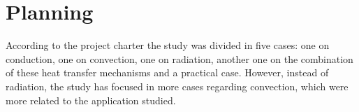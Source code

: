 
\setlength{\parindent}{0pt}

\usepackage{epigraph}
\usepackage{tocloft}
\usepackage{mathcomp}
\usepackage{subcaption}

\usepackage{multicol}
\usepackage[T1]{fontenc}
\usepackage{titlesec, blindtext, color}
\newcommand{\hsp}{\hspace{20pt}}
\titleformat{\chapter}[hang]{\Huge\bfseries}{\thechapter\hsp\textcolor{gray75}{|}\hsp}{0pt}{\Huge\bfseries}


\renewcommand{\familydefault}{\sfdefault}



\newpage\thispagestyle{EmptyPage}


\setcounter{tocdepth}{3}
\tableofcontents
\pagebreak

\newpage
{}

\newpage
\setlength{\parskip}{1em}

\chapter{Planning}
According to the project charter the study was divided in five cases: one on conduction, one on convection,  one on radiation, another one on the combination of these heat transfer mechanisms and a practical case. However, instead of radiation, the study has focused in more cases regarding convection, which were more related to the application studied.

